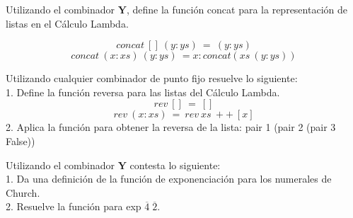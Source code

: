                 \begin{exercise}
                    Utilizando el combinador $\mathbf{Y}$, define la función concat para la representación de listas en el Cálculo Lambda.

                    \[
                        concat\ []\ (y:ys)\ =\ (y:ys)
                    \]
                    \[
                        concat\ (x:xs)\ (y:ys)\ = x:concat(xs\ (y:ys))
                    \]
                \end{exercise}

                \begin{exercise}
                    Utilizando cualquier combinador de punto fijo resuelve lo siguiente:\\
                    
                    1. Define la función reversa para las listas del Cálculo Lambda. \\
                    \[
                        rev\ []\ =\ []
                    \]
                    \[
                        rev\ (x:xs)\ =\ rev\ xs\ ++\ [x]
                    \]
                    2. Aplica la función para obtener la reversa de la lista: pair 1 (pair 2 (pair 3 False))
                \end{exercise}

                \begin{exercise}
                    Utilizando el combinador $\mathbf{Y}$ contesta lo siguiente: \\
                    
                    1. Da una definición de la función de exponenciación para los numerales de Church.\\
                    2. Resuelve la función para exp $\overline{4} \; \overline{2}$.
                \end{exercise}

%

                    
            